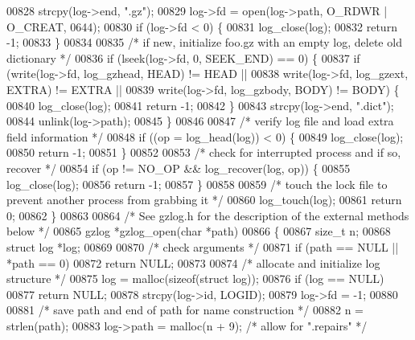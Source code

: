 \begin{DoxyCode}
{00828     strcpy(log->end, \textcolor{stringliteral}{".gz"});
00829     log->fd = open(log->path, O\_RDWR | O\_CREAT, 0644);
00830     \textcolor{keywordflow}{if} (log->fd < 0) \{
00831         log\_close(log);
00832         \textcolor{keywordflow}{return} -1;
00833     \}
00834 
00835     \textcolor{comment}{/* if new, initialize foo.gz with an empty log, delete old dictionary */}
00836     \textcolor{keywordflow}{if} (lseek(log->fd, 0, SEEK\_END) == 0) \{
00837         \textcolor{keywordflow}{if} (write(log->fd, log\_gzhead, HEAD) != HEAD ||
00838             write(log->fd, log\_gzext, EXTRA) != EXTRA ||
00839             write(log->fd, log\_gzbody, BODY) != BODY) \{
00840             log\_close(log);
00841             \textcolor{keywordflow}{return} -1;
00842         \}
00843         strcpy(log->end, \textcolor{stringliteral}{".dict"});
00844         unlink(log->path);
00845     \}
00846 
00847     \textcolor{comment}{/* verify log file and load extra field information */}
00848     \textcolor{keywordflow}{if} ((op = log\_head(log)) < 0) \{
00849         log\_close(log);
00850         \textcolor{keywordflow}{return} -1;
00851     \}
00852 
00853     \textcolor{comment}{/* check for interrupted process and if so, recover */}
00854     \textcolor{keywordflow}{if} (op != NO\_OP && log\_recover(log, op)) \{
00855         log\_close(log);
00856         \textcolor{keywordflow}{return} -1;
00857     \}
00858 
00859     \textcolor{comment}{/* touch the lock file to prevent another process from grabbing it */}
00860     log\_touch(log);
00861     \textcolor{keywordflow}{return} 0;
00862 \}
00863 
00864 \textcolor{comment}{/* See gzlog.h for the description of the external methods below */}
00865 gzlog *gzlog\_open(\textcolor{keywordtype}{char} *path)
00866 \{
00867     \textcolor{keywordtype}{size\_t} n;
00868     \textcolor{keyword}{struct }log *log;
00869 
00870     \textcolor{comment}{/* check arguments */}
00871     \textcolor{keywordflow}{if} (path == NULL || *path == 0)
00872         \textcolor{keywordflow}{return} NULL;
00873 
00874     \textcolor{comment}{/* allocate and initialize log structure */}
00875     log = malloc(\textcolor{keyword}{sizeof}(\textcolor{keyword}{struct} log));
00876     \textcolor{keywordflow}{if} (log == NULL)
00877         \textcolor{keywordflow}{return} NULL;
00878     strcpy(log->id, LOGID);
00879     log->fd = -1;
00880 
00881     \textcolor{comment}{/* save path and end of path for name construction */}
00882     n = strlen(path);
00883     log->path = malloc(n + 9);              \textcolor{comment}{/* allow for ".repairs" */}
}
\end{DoxyCode}
